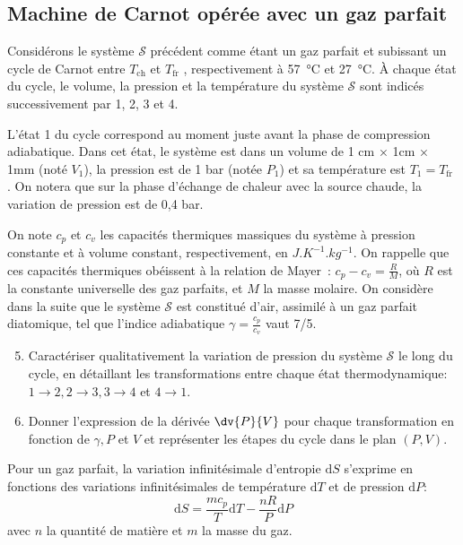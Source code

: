 \documentclass[a4paper, 12pt, garamond]{book}
\begin{document}
\subsection{Machine de Carnot opérée avec un gaz parfait}

Considérons le système \(\mathcal{S}\) précédent comme étant un gaz parfait et
subissant un cycle de Carnot entre \(T_\mathrm{ch}\) et \(T_\mathrm{fr}\) ,
respectivement à \SI{57}{\degreeCelsius} et \SI{27}{\degreeCelsius}. À chaque
état du cycle, le volume, la pression et la température du système
\(\mathcal{S}\) sont indicés successivement par 1, 2, 3 et 4.

L'état 1 du cycle correspond au moment juste avant la phase de
compression adiabatique. Dans cet état, le système est dans un volume de
1 cm × 1cm × 1mm (noté \(V_1\)), la pression est de 1 bar (notée
\(P_1\)) et sa température est \(T_1 = T_\mathrm{fr}\) . On notera que
sur la phase d'échange de chaleur avec la source chaude, la variation de
pression est de 0,4 bar.

On note \(c_p\) et \(c_v\) les capacités thermiques massiques du système
à pression constante et à volume constant, respectivement, en
\(\si{J.K^{-1}.kg^{-1}}\). On rappelle que ces capacités thermiques
obéissent à la relation de Mayer~: \(c_p - c_v = \frac{R}{M}\), où \(R\)
est la constante universelle des gaz parfaits, et \(M\) la masse
molaire. On considère dans la suite que le système \(\mathcal{S}\) est
constitué d'air, assimilé à un gaz parfait diatomique, tel que l'indice
adiabatique \(\gamma = \frac{c_p}{c_v}\) vaut 7/5.

\begin{enumerate}
	\setcounter{enumi}{4}
	\item
	      Caractériser qualitativement la variation de pression du système
	      \(\mathcal{S}\) le long du cycle, en détaillant les transformations
	      entre chaque état thermodynamique: \(1 \to 2, 2 \to 3, 3 \to 4\) et
	      \(4 \to 1\).
	\item
	      Donner l'expression de la dérivée \(\dv{P}{V}\) pour chaque
	      transformation en fonction de \(\gamma, P\) et \(V\) et représenter
	      les étapes du cycle dans le plan \((P,V)\).
\end{enumerate}

Pour un gaz parfait, la variation infinitésimale d'entropie
\(\mathrm{d} S\) s'exprime en fonctions des variations infinitésimales
de température \(\mathrm{d} T\) et de pression \(\mathrm{d} P\):
\[\mathrm{d}S = \frac{m c_p}{T} \mathrm{d}T - \frac{nR}{P}\mathrm{d}P \]
avec \(n\) la quantité de matière et \(m\) la masse du gaz.
\end{document}
